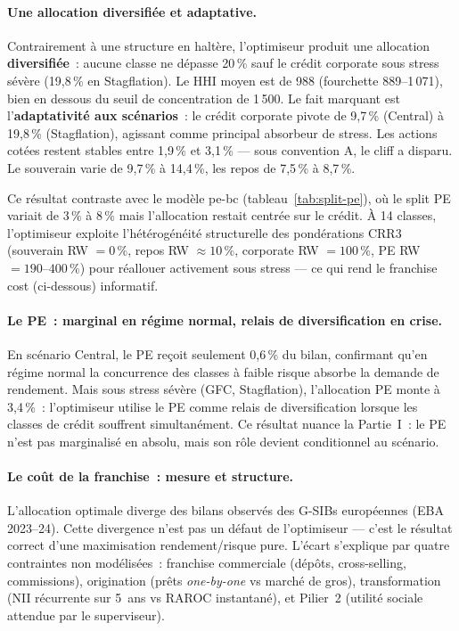 \documentclass[10pt, a4paper, oneside]{report}
\theoremstyle{definition}
\begin{document}
\paragraph{Une allocation diversifiée et adaptative.} Contrairement à une structure en haltère, l'optimiseur produit une allocation \textbf{diversifiée}~: aucune classe ne dépasse 20\,\% sauf le crédit corporate sous stress sévère (19{,}8\,\% en Stagflation). Le HHI moyen est de 988 (fourchette 889--1\,071), bien en dessous du seuil de concentration de 1\,500. Le fait marquant est l'\textbf{adaptativité aux scénarios}~: le crédit corporate pivote de 9{,}7\,\% (Central) à 19{,}8\,\% (Stagflation), agissant comme principal absorbeur de stress. Les actions cotées restent stables entre 1{,}9\,\% et 3{,}1\,\% --- sous convention A, le cliff a disparu. Le souverain varie de 9{,}7\,\% à 14{,}4\,\%, les repos de 7{,}5\,\% à 8{,}7\,\%.

Ce résultat contraste avec le modèle pe-bc (tableau~\ref{tab:split-pe}), où le split PE variait de 3\,\% à 8\,\% mais l'allocation restait centrée sur le crédit. À 14 classes, l'optimiseur exploite l'hétérogénéité structurelle des pondérations CRR3 (souverain RW $= 0\,\%$, repos RW $\approx 10\,\%$, corporate RW $= 100\,\%$, PE RW $= 190$--$400\,\%$) pour réallouer activement sous stress --- ce qui rend le franchise cost (ci-dessous) informatif.

\paragraph{Le PE~: marginal en régime normal, relais de diversification en crise.} En scénario Central, le PE reçoit seulement 0{,}6\,\% du bilan, confirmant qu'en régime normal la concurrence des classes à faible risque absorbe la demande de rendement. Mais sous stress sévère (GFC, Stagflation), l'allocation PE monte à 3{,}4\,\%~: l'optimiseur utilise le PE comme relais de diversification lorsque les classes de crédit souffrent simultanément. Ce résultat nuance la Partie~I~: le PE n'est pas marginalisé en absolu, mais son rôle devient conditionnel au scénario.

\paragraph{Le coût de la franchise~: mesure et structure.}
L'allocation optimale diverge des bilans observés des G-SIBs européennes (EBA 2023--24). Cette divergence n'est pas un défaut de l'optimiseur --- c'est le résultat correct d'une maximisation rendement/risque pure. L'écart s'explique par quatre contraintes non modélisées~: franchise commerciale (dépôts, cross-selling, commissions), origination (prêts \emph{one-by-one} vs marché de gros), transformation (NII récurrente sur 5~ans vs RAROC instantané), et Pilier~2 (utilité sociale attendue par le superviseur).
\end{document}
